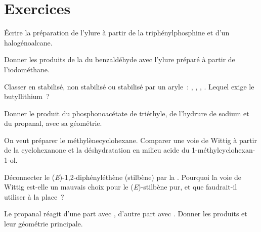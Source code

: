 \section{Exercices}

\begin{exercise}[$\star$]\label{exo:b2:wittig:1}
Écrire la préparation de l'ylure  à partir de la triphénylphosphine et d'un halogénoalcane.
\end{exercise}

\begin{exercise}[$\star$]\label{exo:b2:wittig:2}
Donner les produits de la  du benzaldéhyde avec l'ylure préparé à partir de l'iodométhane.
\end{exercise}

\begin{exercise}[$\star$]\label{exo:b2:wittig:3}
Classer en stabilisé, non stabilisé ou stabilisé par un aryle~: , ,
, . Lequel exige le butyllithium~?
\end{exercise}

\begin{exercise}[$\star$]\label{exo:b2:wittig:4}
Donner le produit du phosphonoacétate de triéthyle, de l'hydrure de sodium et du propanal, avec sa géométrie.
\end{exercise}

\begin{exercise}[$\star\star$]\label{exo:b2:wittig:5}
On veut préparer le méthylènecyclohexane. Comparer une voie de Wittig à partir de la cyclohexanone et
la déshydratation en milieu acide du 1-méthylcyclohexan-1-ol.
\end{exercise}

\begin{exercise}[$\star\star$]\label{exo:b2:wittig:6}
Déconnecter le (\textit{E})-1,2-diphényléthène (stilbène) par la . Pourquoi la voie
de Wittig est-elle un mauvais choix pour le (\textit{E})-stilbène pur, et que faudrait-il utiliser à la place~?
\end{exercise}

\begin{exercise}[$\star\star$]\label{exo:b2:wittig:7}
Le propanal réagit d'une part avec , d'autre part avec . Donner les
produits et leur géométrie principale.
\end{exercise}

